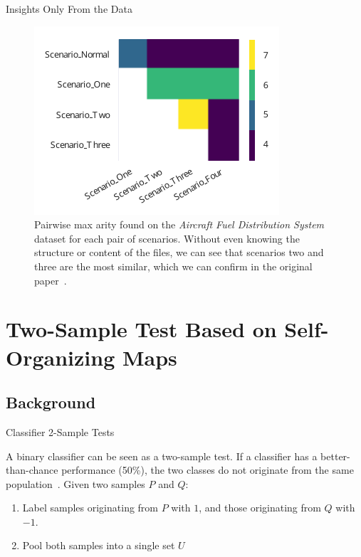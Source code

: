 \documentclass[10pt]{beamer}
\begin{document}
\begin{frame}{Insights Only From the Data}
\begin{figure}
    \centering
    \includegraphics{afds}
    \caption{
        Pairwise max arity found on the \emph{Aircraft Fuel Distribution System} dataset for each pair of scenarios.
        Without even knowing the structure or content of the files, we can see that
        scenarios two and three are the most similar, which we can confirm in the
        original paper~\cite{Gheraibia2019}.
    }
\end{figure}
\end{frame}

\section{Two-Sample Test Based on Self-Organizing Maps}

\subsection{Background}

\begin{frame}{Classifier 2-Sample Tests}
    \begin{block}{}
        A binary classifier can be seen as a two-sample test.
        If a classifier has a better-than-chance performance (50\%), the two classes do not originate from the same
        population~\cite{friedman2004multivariate}.
        \smallskip
        Given two samples $P$ and $Q$:
        \begin{enumerate}
            \item Label samples originating from $P$ with $1$, and those originating from $Q$ with $-1$.
            \item Pool both samples into a single set $U$
        \end{enumerate}
    \end{block}
\end{frame}
\end{document}

